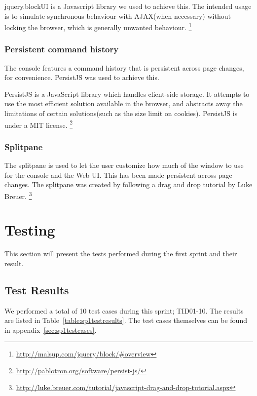 jquery.blockUI is a Javascript library we used to achieve this. The intended usage is to simulate synchronous behaviour with AJAX(when necessary) without locking the browser, which is generally unwanted behaviour.
\footnote{\url{http://malsup.com/jquery/block/\#overview}}

\subsubsection{Persistent command history}
The console features a command history that is persistent across page changes, for convenience. PersistJS was used to achieve this.

PersistJS is a JavaScript library which handles client-side storage. It attempts to use the most efficient solution available in the browser, and abstracts away the limitations of certain solutions(such as the size limit on cookies).
PersistJS is under a MIT license.
\footnote{\url{http://pablotron.org/software/persist-js/}}

\subsubsection{Splitpane}
The splitpane is used to let the user customize how much of the window to use for the console and the Web UI. This has been made persistent across page changes.
The splitpane was created by following a drag and drop tutorial by Luke Breuer.
\footnote{\url{http://luke.breuer.com/tutorial/javascript-drag-and-drop-tutorial.aspx}}



\section{Testing}
This section will present the tests performed during the first sprint and their result.

\subsection{Test Results}
We performed a total of 10 test cases during this sprint; TID01-10. The results are listed in Table~\ref{table:sp1testresults}. The test cases themselves can be found in appendix~\ref{sec:sp1testcases}.

